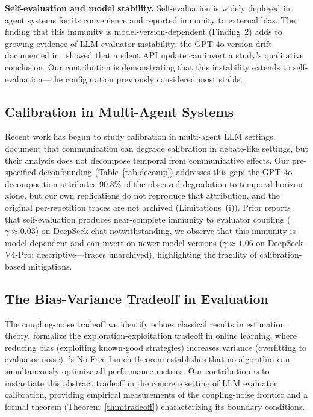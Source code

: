\documentclass[11pt]{article}
\theoremstyle{definition}
\theoremstyle{remark}
\begin{document}
\textbf{Self-evaluation and model stability.} Self-evaluation is widely deployed in agent systems for its convenience and reported immunity to external bias. The finding that this immunity is model-version-dependent (Finding~2) adds to growing evidence of LLM evaluator instability: the GPT-4o version drift documented in~\citep{epc2026} showed that a silent API update can invert a study's qualitative conclusion. Our contribution is demonstrating that this instability extends to self-evaluation---the configuration previously considered most stable.




\subsection{Calibration in Multi-Agent Systems}

Recent work has begun to study calibration in multi-agent LLM settings. \citet{huang2026cagecal} document that communication can degrade calibration in debate-like settings, but their analysis does not decompose temporal from communicative effects. Our pre-specified deconfounding (Table~\ref{tab:decomp}) addresses this gap: the GPT-4o decomposition attributes 90.8\% of the observed degradation to temporal horizon alone, but our own replications do not reproduce that attribution, and the original per-repetition traces are not archived (Limitations~(i)). Prior reports that self-evaluation produces near-complete immunity to evaluator coupling ($\gamma{\approx}0.03$) on DeepSeek-chat notwithstanding, we observe that this immunity is model-dependent and can invert on newer model versions ($\gamma{\approx}1.06$ on DeepSeek-V4-Pro; descriptive---traces unarchived), highlighting the fragility of calibration-based mitigations.

\subsection{The Bias-Variance Tradeoff in Evaluation}

The coupling-noise tradeoff we identify echoes classical results in estimation theory. \citet{bubeck2012regret} formalize the exploration-exploitation tradeoff in online learning, where reducing bias (exploiting known-good strategies) increases variance (overfitting to evaluator noise). \citet{wolpert1997no}'s No Free Lunch theorem establishes that no algorithm can simultaneously optimize all performance metrics. Our contribution is to instantiate this abstract tradeoff in the concrete setting of LLM evaluator calibration, providing empirical measurements of the coupling-noise frontier and a formal theorem (Theorem~\ref{thm:tradeoff}) characterizing its boundary conditions.
\end{document}

